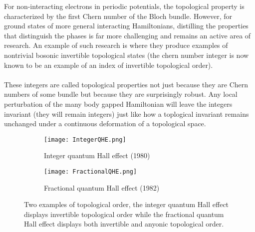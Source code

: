 For non-interacting electrons in periodic potentials, the topological property is characterized by the first Chern number of the Bloch bundle. However, for ground states of more general interacting Hamiltonians, distilling the properties that distinguish the phases is far more challenging and remains an active area of research. An example of such research is \cite{sopenko2023chiral} where they produce examples of nontrivial bosonic invertible topological states (the chern number integer is now known to be an example of an index of invertible topological order).
\\\\
These integers are called topological properties not just because they are Chern numbers of some bundle but because they are surprisingly robust. Any local perturbation of the many body gapped Hamiltonian will leave the integers invariant (they will remain integers) just like how a toplogical invariant remains unchanged under a continuous deformation of a topological space.
\begin{figure}
	\centering
	\begin{subfigure}[b]{0.45\textwidth}
		\centering
		\texttt{[image: IntegerQHE.png]}
		\caption{Integer quantum Hall effect (1980)}
	\end{subfigure}
	\hfill
	\begin{subfigure}[b]{0.45\textwidth}
		\centering
		\texttt{[image: FractionalQHE.png]}
		\caption{Fractional quantum Hall effect (1982)}
	\end{subfigure}
	\caption{Two examples of topological order, the integer quantum Hall effect displays invertible topological order while the fractional quantum Hall effect displays both invertible and anyonic topological order.}
	\label{fig:TopologicalOrderFigures}
\end{figure}
